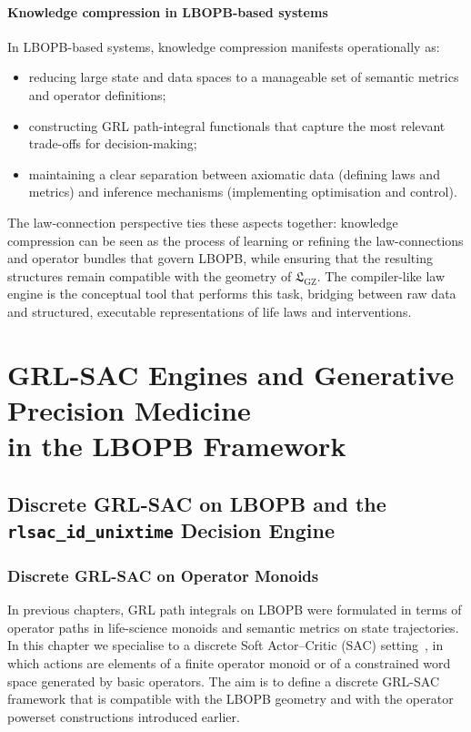 \documentclass[11pt]{book}
\theoremstyle{plain}
\theoremstyle{definition}
\theoremstyle{remark}
\newcommand{\GZLS}{\ensuremath{\mathfrak{L}_{\mathrm{GZ}}}}       \newcommand{\GZLT}{\ensuremath{M_{!w}}}                           \newcommand{\GZLOC}{\ensuremath{A_M}}                             \newcommand{\GZLCurv}{\ensuremath{\mathcal{F}_{\mathrm{law}}}}
\begin{document}
\subsection*{Knowledge compression in LBOPB-based systems}

In LBOPB-based systems, knowledge compression manifests operationally
as:

\begin{itemize}
  \item reducing large state and data spaces to a manageable set of
        semantic metrics and operator definitions;
  \item constructing GRL path-integral functionals that capture the
        most relevant trade-offs for decision-making;
  \item maintaining a clear separation between axiomatic data
        (defining laws and metrics) and inference mechanisms
        (implementing optimisation and control).
\end{itemize}

The law-connection perspective ties these aspects together: knowledge
compression can be seen as the process of learning or refining the
law-connections and operator bundles that govern LBOPB, while ensuring
that the resulting structures remain compatible with the geometry of
$\GZLS$. The compiler-like law engine is the conceptual tool that
performs this task, bridging between raw data and structured, executable
representations of life laws and interventions.



\part[GRL-SAC Engines and Generative Precision Medicine]{GRL-SAC Engines and Generative Precision Medicine\\
      in the LBOPB Framework}

\chapter[Discrete GRL-SAC on LBOPB and the rlsac-id-unixtime Engine]{Discrete GRL-SAC on LBOPB and the \texttt{rlsac\_id\_unixtime} Decision Engine}


\section{Discrete GRL-SAC on Operator Monoids}


In previous chapters, GRL path integrals on LBOPB were formulated
in terms of operator paths in life-science monoids and semantic
metrics on state trajectories. In this chapter we specialise to a
discrete Soft Actor–Critic (SAC) setting~\cite{Haarnoja2018SAC}, in which actions are
elements of a finite operator monoid or of a constrained word space
generated by basic operators. The aim is to define a discrete
GRL-SAC framework that is compatible with the LBOPB geometry and with
the operator powerset constructions introduced earlier.
\end{document}
